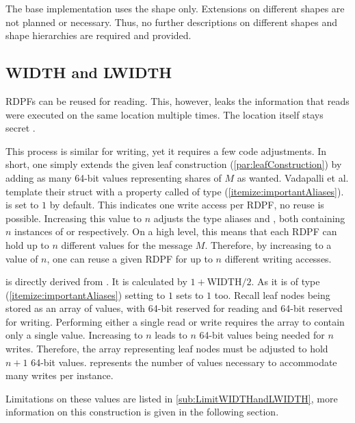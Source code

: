 The base implementation uses the  shape only.
Extensions on different shapes are not planned or necessary. 
Thus, no further descriptions on different shapes and shape hierarchies are required and provided.

\subsection*{WIDTH and LWIDTH}\label{subsub:WIDTHandLWIDTH}
RDPFs can be reused for reading.
This, however, leaks the information that reads were executed on the same location multiple times.
The location itself stays secret \cite{vadapalli2023duoram}.

This process is similar for writing, yet it requires a few code adjustments.
In short, one simply extends the given leaf construction (\ref{par:leafConstruction}) by adding as many 64-bit values representing shares of $M$ as wanted.
Vadapalli et al. template their  struct with a property called  of type  (\ref{itemize:importantAliases}).
 is set to $1$ by default.
This indicates one write access per RDPF, no reuse is possible.
Increasing this value to $n$ adjusts the type aliases  and , both containing $n$ instances of  or  respectively.
On a high level, this means that each RDPF can hold up to $n$ different values for the message $M$.
Therefore, by increasing  to a value of $n$, one can reuse a given RDPF for up to $n$ different writing accesses.

 is directly derived from .
It is calculated by $1+\text{WIDTH}/2$.
As it is of type  (\ref{itemize:importantAliases}) setting  to $1$ sets  to $1$ too.
Recall leaf nodes being stored as an array of  values, with 64-bit reserved for reading and 64-bit reserved for writing.
Performing either a single read or write requires the array to contain only a single  value.
Increasing  to $n$ leads to $n$ 64-bit values being needed for $n$ writes.
Therefore, the array representing leaf nodes must be adjusted to hold $n+1$ 64-bit values.
 represents the number of  values necessary to accommodate  many writes per instance.

Limitations on these values are listed in \ref{sub:LimitWIDTHandLWIDTH}, more information on this construction is given in the following section.

